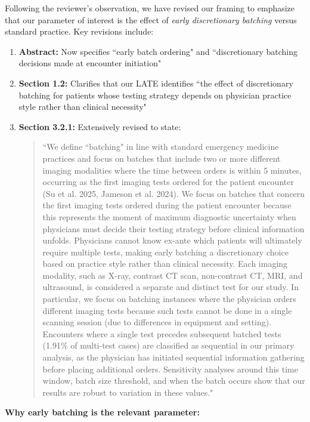 \documentclass[11pt]{article}
\newcommand{\1}{\hbox{\rm 1\kern-.35em 1}}
\begin{document}
{{Following the reviewer's observation, we have revised our framing to emphasize that our parameter of interest is the effect of \textit{early discretionary batching} versus standard practice. Key revisions include:

\begin{enumerate}
\item \textbf{Abstract:} Now specifies ``early batch ordering" and ``discretionary batching decisions made at encounter initiation"
\item \textbf{Section 1.2:} Clarifies that our LATE identifies ``the effect of discretionary batching for patients whose testing strategy depends on physician practice style rather than clinical necessity"
\item \textbf{Section 3.2.1:} Extensively revised to state:
\begin{quote}
``We define ``batching" in line with standard emergency medicine practices and focus on batches that include two or more different imaging modalities where the time between orders is within 5 minutes, occurring as the first imaging tests ordered for the patient encounter (Su et al. 2025, Jameson et al. 2024). We focus on batches that concern the first imaging tests ordered during the patient encounter because this represents the moment of maximum diagnostic uncertainty when physicians must decide their testing strategy before clinical information unfolds. Physicians cannot know ex-ante which patients will ultimately require multiple tests, making early batching a discretionary choice based on practice style rather than clinical necessity. Each imaging modality, such as X-ray, contrast CT scan, non-contrast CT, MRI, and ultrasound, is considered a separate and distinct test for our study. In particular, we focus on batching instances where the physician orders different imaging tests because such tests cannot be done in a single scanning session (due to differences in equipment and setting). Encounters where a single test precedes subsequent batched tests (1.91\% of multi-test cases) are classified as sequential in our primary analysis, as the physician has initiated sequential information gathering before placing additional orders. Sensitivity analyses around this time window, batch size threshold, and when the batch occurs show that our results are robust to variation in these values."
\end{quote}
\end{enumerate}

\textbf{Why early batching is the relevant parameter:}

}}
\end{document}
